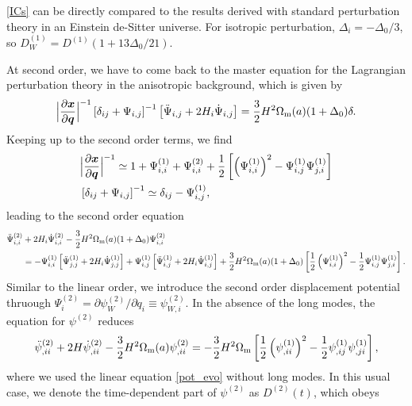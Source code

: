 \documentclass[a4paper,11pt]{article}
\newcommand{\vx}{{\bm x}}
\newcommand{\vq}{{\bm q}}
\begin{document}
\eqref{ICs} can be directly compared to the results derived with standard
perturbation theory in an Einstein de-Sitter universe.
For isotropic perturbation, $\Delta_i = - \Delta_0 / 3$, so $D^{(1)}_W = D^{(1)} (1 + 13
\Delta_0 / 21)$.

At second order, we have to come back to the master equation for the Lagrangian perturbation theory
in the anisotropic background, which is given by
\begin{align}
    \Bigl| \frac{\partial\vx}{\partial\vq} \Bigr|^{-1} 
    \left[ \delta_{ij} + \Psi_{i,j} \right]^{-1}
    \left[ \ddot{\Psi}_{i,j} + 2H_i\dot{\Psi}_{i,j} \right]
    =\frac32 H^2\Omega_{\rm m}(a)(1+\Delta_0)\delta.
\end{align}
Keeping up to the second order terms, we find 
\begin{align}
&\Bigl| \frac{\partial\vx}{\partial\vq} \Bigr|^{-1}  \simeq 
    1 + \Psi_{i,i}^{(1)} + \Psi_{i,i}^{(2)} + \frac12 \left[\left(\Psi_{i,i}^{(1)} \right)^2 - \Psi_{i,j}^{(1)}\Psi_{j,i}^{(1)} \right]
    \\
&\left[ \delta_{ij} + \Psi_{i,j} \right]^{-1} \simeq \delta_{ij} - \Psi_{i,j}^{(1)},
\end{align}
leading to the second order equation
\begin{align}
\ddot \Psi^{(2)}_{i,i} &+ 2H_i\dot \Psi^{(2)}_{i,i} -\frac32 H^2\Omega_{\rm m}(a)(1+\Delta_0)\Psi_{i,i}^{(2)}
    \nonumber\\
    &= -\Psi_{i,i}^{(1)}\left[\ddot \Psi^{(1)}_{j,j} + 2H_i\dot \Psi_{j,j}^{(1)} \right]
    + \Psi_{i,j}^{(1)}\left[\ddot \Psi^{(1)}_{i,j} + 2H_i\dot \Psi_{i,j}^{(1)} \right]
    + \frac32 H^2 \Omega_{\rm m}(a) (1+\Delta_0) 
    \left[\frac12\left(\Psi_{i,i}^{(1)}\right)^2 - \frac12\Psi_{i,j}^{(1)}\Psi_{j,i}^{(1)}  \right].
\end{align}
Similar to the linear order, we introduce the second order displacement potential
thruough $\Psi_i^{(2)} = \partial\psi_W^{(2)}/\partial q_i \equiv \psi^{(2)}_{W,i}$. 
In the absence of the long modes, the equation for $\psi^{(2)}$ reduces
\begin{align}
\ddot \psi^{(2)}_{,ii} + 2H\dot \psi^{(2)}_{,ii}-\frac32 H^2 \Omega_{\rm m}(a)\psi^{(2)}_{,ii}
 = -\frac32 H^2 \Omega_{\rm m}\left[\frac12 \left( \psi^{(1)}_{,ii} \right)^2 -\frac12 \psi^{(1)}_{,ij}\psi^{(1)}_{,ji} \right],
\end{align}
where we used the linear equation \eqref{pot_evo} without long modes.
In this usual case, we denote the time-dependent part of $\psi^{(2)}$ as $D^{(2)}(t)$, which obeys
\end{document}

